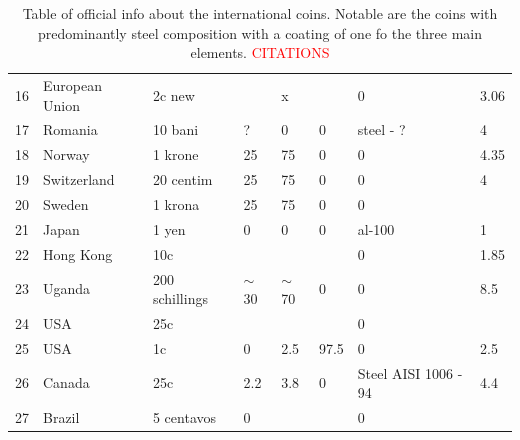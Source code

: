 \documentclass[11pt,a4paper,twoside,onecolumn]{article}
\newcommand{\reminder}[1]{\textcolor{red}{#1}}
\begin{document}
\begin{table}[htbp]
\begin{tabular}{@{}llllllll@{}}
        16 & European Union & 2c new         &          & x        &        & 0                    & 3.06       \\
        17 & Romania        & 10 bani        & ?        & 0        & 0      & steel - ?            & 4          \\
        18 & Norway         & 1 krone        & 25       & 75       & 0      & 0                    & 4.35       \\
        19 & Switzerland    & 20 centim      & 25       & 75       & 0      & 0                    & 4          \\
        20 & Sweden         & 1 krona        & 25       & 75       & 0      & 0                    &            \\
        21 & Japan          & 1 yen          & 0        & 0        & 0      & al-100               & 1          \\
        22 & Hong Kong      & 10c            &          &          &        & 0                    & 1.85       \\
        23 & Uganda         & 200 schillings & $\sim$30 & $\sim$70 & 0      & 0                    & 8.5        \\
        24 & USA            & 25c            &          &          &        & 0                    &            \\
        25 & USA            & 1c             & 0        & 2.5      & 97.5   & 0                    & 2.5        \\
        26 & Canada         & 25c            & 2.2      & 3.8      & 0      & Steel AISI 1006 - 94 & 4.4        \\
        27 & Brazil         & 5 centavos     & 0        &          &        & 0                    &            \\ \bottomrule
    \end{tabular}
    \caption{Table of official info about the international coins. Notable are the coins with predominantly steel composition with a coating of one fo the three main elements. \reminder{CITATIONS}}
    \label{tab:coins-official}
\end{table}
\end{document}
